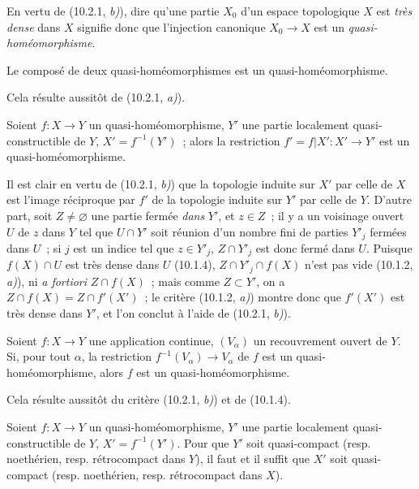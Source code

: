 En vertu de (10.2.1, \emph{b)}), dire qu'une partie $X_0$ d'un espace
topologique $X$ est \emph{très dense} dans $X$ signifie donc que l'injection
canonique $X_0\to X$ est un \emph{quasi-homéomorphisme}.

\begin{corollary}[10.2.3]
\label{IV.10.2.3-fr}
Le composé de deux quasi-homéomorphismes est un quasi-homéomorphisme.
\end{corollary}

Cela résulte aussitôt de (10.2.1, \emph{a)}).

\begin{corollary}[10.2.4]
\label{IV.10.2.4-fr}
Soient $f:X\to Y$ un quasi-homéomorphisme, $Y'$ une partie localement
quasi-constructible de $Y$, $X'=f^{-1}(Y')$~; alors la restriction
$f'=f|X':X'\to Y'$ est un quasi-homéomorphisme.
\end{corollary}

Il est clair en vertu de (10.2.1, \emph{b)}) que la topologie induite sur $X'$
par celle de $X$ est l'image réciproque par $f'$ de la topologie induite sur
$Y'$ par celle de $Y$. D'autre part,
soit $Z\neq\varnothing$ une partie fermée \emph{dans} $Y'$, et $z\in Z$~; il
y a un voisinage ouvert $U$ de $z$ dans $Y$ tel que $U\cap Y'$ soit réunion
d'un nombre fini de parties $Y'_j$ fermées dans $U$~; si $j$ est un indice tel
que $z\in Y'_j$, $Z\cap Y'_j$ est donc fermé dans $U$. Puisque $f(X)\cap U$
est très dense dans $U$ (10.1.4), $Z\cap Y'_j\cap f(X)$ n'est pas vide
(10.1.2, \emph{a)}), ni \emph{a fortiori} $Z\cap f(X)$~; mais comme
$Z\subset Y'$, on a $Z\cap f(X)=Z\cap f'(X')$~; le critère
(10.1.2, \emph{a)}) montre donc que $f'(X')$ est très dense dans $Y'$, et
l'on conclut à l'aide de (10.2.1, \emph{b)}).

\begin{corollary}[10.2.5]
\label{IV.10.2.5-fr}
Soient $f:X\to Y$ une application continue, $(V_\alpha)$ un recouvrement
ouvert de $Y$. Si, pour tout $\alpha$, la restriction
$f^{-1}(V_\alpha)\to V_\alpha$ de $f$ est un quasi-homéomorphisme, alors $f$
est un quasi-homéomorphisme.
\end{corollary}

Cela résulte aussitôt du critère (10.2.1, \emph{b)}) et de (10.1.4).

\begin{corollary}[10.2.6]
\label{IV.10.2.6-fr}
Soient $f:X\to Y$ un quasi-homéomorphisme, $Y'$ une partie localement
quasi-constructible de $Y$, $X'=f^{-1}(Y')$. Pour que $Y'$ soit quasi-compact
(resp. noethérien, resp. rétrocompact dans $Y$), il faut et il suffit que $X'$
soit quasi-compact (resp. noethérien, resp. rétrocompact dans $X$).
\end{corollary}

